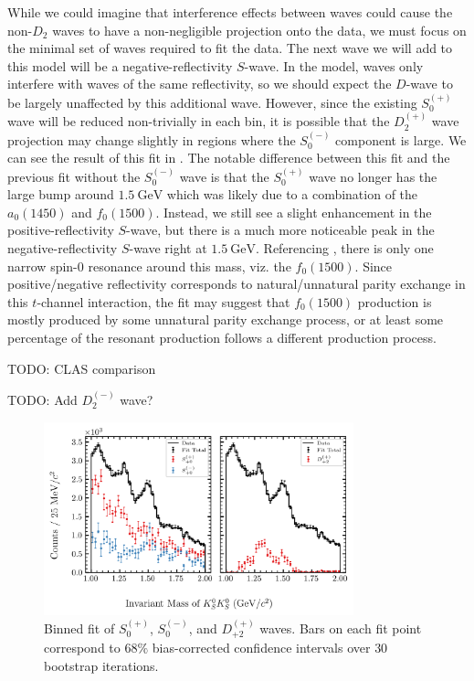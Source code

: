 While we could imagine that interference effects between waves could cause the non-$D_2$ waves to have a non-negligible projection onto the data, we must focus on the minimal set of waves required to fit the data. The next wave we will add to this model will be a negative-reflectivity $S$-wave. In the model, waves only interfere with waves of the same reflectivity, so we should expect the $D$-wave to be largely unaffected by this additional wave. However, since the existing $S_0^{(+)}$ wave will be reduced non-trivially in each bin, it is possible that the $D_2^{(+)}$ wave projection may change slightly in regions where the $S_0^{(-)}$ component is large. We can see the result of this fit in . The notable difference between this fit and the previous fit without the $S_0^{(-)}$ wave is that the $S_0^{(+)}$ wave no longer has the large bump around $\SI{1.5}{\giga\electronvolt}$ which was likely due to a combination of the $a_0(1450)$ and $f_0(1500)$. Instead, we still see a slight enhancement in the positive-reflectivity $S$-wave, but there is a much more noticeable peak in the negative-reflectivity $S$-wave right at $\SI{1.5}{\giga\electronvolt}$. Referencing , there is only one narrow spin-$0$ resonance around this mass, viz. the $f_0(1500)$. Since positive/negative reflectivity corresponds to natural/unnatural parity exchange in this $t$-channel interaction, the fit may suggest that $f_0(1500)$ production is mostly produced by some unnatural parity exchange process, or at least some percentage of the resonant production follows a different production process.

{\color{red}TODO: CLAS comparison}

{\color{red}TODO: Add $D_2^{(-)}$ wave?}

\begin{figure}
  \begin{center}
    \includegraphics[width=0.8\textwidth]{figures/binned_fit_chisqdof_3.4_splot_D_1s_2b_phase_factor_waves29099_uncertainty_bootstrap-CI-BC.png}
  \end{center}
  \caption{Binned fit of $S_{0}^{(+)}$, $S_{0}^{(-)}$, and $D_{+2}^{(+)}$ waves. Bars on each fit point correspond to $68\%$ bias-corrected confidence intervals over $ 30 $ bootstrap iterations.}\label{fig:binned-fit-chisqdof-3.4-Spn-D2p}
\end{figure}



